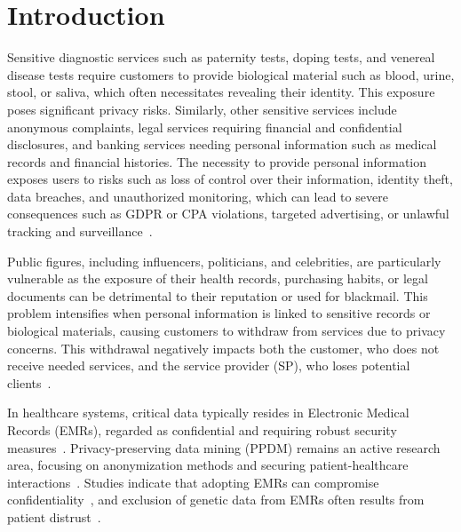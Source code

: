 \documentclass[pdftex,twocolumn,epjc3]{svjour3}
\begin{document}
\section{Introduction}
\label{sec:introduction}
\begin{sloppypar}
Sensitive diagnostic services such as paternity tests, doping tests, and venereal disease tests require customers to provide biological material such as blood, urine, stool, or saliva, which often necessitates revealing their identity. This exposure poses significant privacy risks. Similarly, other sensitive services include anonymous complaints, legal services requiring financial and confidential disclosures, and banking services needing personal information such as medical records and financial histories. The necessity to provide personal information exposes users to risks such as loss of control over their information, identity theft, data breaches, and unauthorized monitoring, which can lead to severe consequences such as GDPR or CPA violations, targeted advertising, or unlawful tracking and surveillance~\cite{smithInformationPrivacyResearch2011}.
\end{sloppypar}

\begin{sloppypar}
Public figures, including influencers, politicians, and celebrities, are particularly vulnerable as the exposure of their health records, purchasing habits, or legal documents can be detrimental to their reputation or used for blackmail. This problem intensifies when personal information is linked to sensitive records or biological materials, causing customers to withdraw from services due to privacy concerns. This withdrawal negatively impacts both the customer, who does not receive needed services, and the service provider (SP), who loses potential clients~\cite{klitzmanExclusionGeneticInformation2010,blackPresymptomaticTestingConfidentiality2021}.
\end{sloppypar}

\begin{sloppypar}
In healthcare systems, critical data typically resides in Electronic Medical Records (EMRs), regarded as confidential and requiring robust security measures~\cite{jinReviewSecurePrivacypreserving2019,keshtaSecurityPrivacyElectronic2021}. Privacy-preserving data mining (PPDM) remains an active research area, focusing on anonymization methods and securing patient-healthcare interactions~\cite{nareshPrivacyPreservingData2023,linPPSFOpensourcePrivacypreserving2018,hewagePrivacypreservingDataStream2023}. Studies indicate that adopting EMRs can compromise confidentiality~\cite{blackPresymptomaticTestingConfidentiality2021}, and exclusion of genetic data from EMRs often results from patient distrust~\cite{klitzmanExclusionGeneticInformation2010}.
\end{sloppypar}
\end{document}
